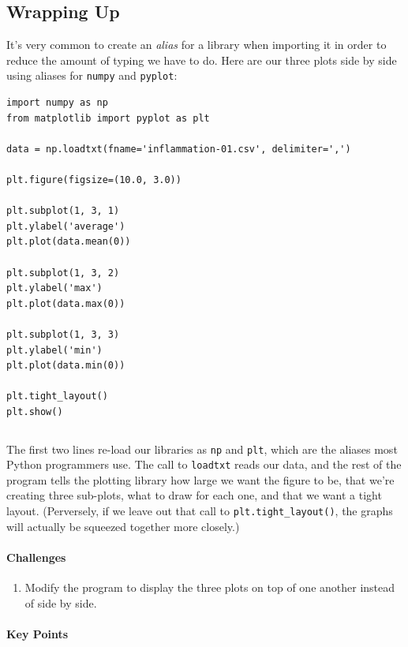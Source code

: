 \documentclass[]{book}
\newcommand{\gdef}[2]{\emph{#2}}
\begin{document}
\subsection{Wrapping Up}

It's very common to create an \gdef{g:alias-library}{alias} for a
library when importing it in order to reduce the amount of typing we
have to do. Here are our three plots side by side using aliases for
\texttt{numpy} and \texttt{pyplot}:

\begin{verbatim}
import numpy as np
from matplotlib import pyplot as plt

data = np.loadtxt(fname='inflammation-01.csv', delimiter=',')

plt.figure(figsize=(10.0, 3.0))

plt.subplot(1, 3, 1)
plt.ylabel('average')
plt.plot(data.mean(0))

plt.subplot(1, 3, 2)
plt.ylabel('max')
plt.plot(data.max(0))

plt.subplot(1, 3, 3)
plt.ylabel('min')
plt.plot(data.min(0))

plt.tight_layout()
plt.show()
\end{verbatim}

\begin{verbatim}
\end{verbatim}

The first two lines re-load our libraries as \texttt{np} and
\texttt{plt}, which are the aliases most Python programmers use. The
call to \texttt{loadtxt} reads our data, and the rest of the program
tells the plotting library how large we want the figure to be, that
we're creating three sub-plots, what to draw for each one, and that we
want a tight layout. (Perversely, if we leave out that call to
\texttt{plt.tight\_layout()}, the graphs will actually be squeezed
together more closely.)

\mbox{}\paragraph{Challenges}

\begin{enumerate}
\item
  Modify the program to display the three plots on top of one another
  instead of side by side.
\end{enumerate}

\mbox{}\paragraph{Key Points}
\end{document}
